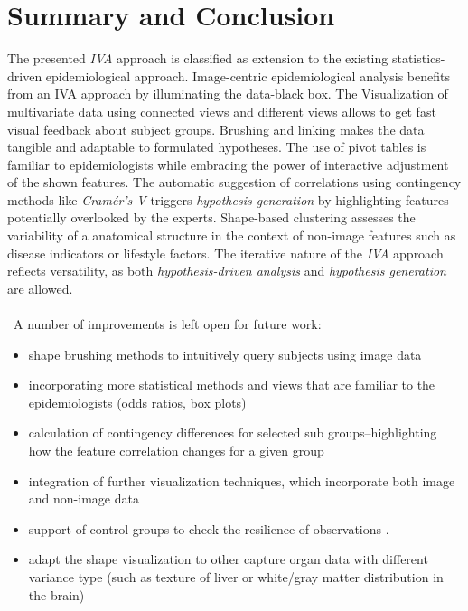 \documentclass[journal]{style/vgtc} 			          %
\begin{document}
\section{Summary and Conclusion}
The presented \emph{IVA} approach is classified as extension to the existing statistics-driven epidemiological approach.
%
Image-centric epidemiological analysis benefits from an IVA approach by illuminating the data-black box.
%
The Visualization of multivariate data using connected views and different views allows to get fast visual feedback about subject groups.
%
Brushing and linking makes the data tangible and adaptable to formulated hypotheses.
%
The use of pivot tables is familiar to epidemiologists while embracing the power of interactive adjustment of the shown features.
%
The automatic suggestion of correlations using contingency methods like \emph{Cram\'{e}r's V} triggers \emph{hypothesis generation} by highlighting features potentially overlooked by the experts.
%
Shape-based clustering assesses the variability of a anatomical structure in the context of non-image features such as disease indicators or lifestyle factors.
%
The iterative nature of the \emph{IVA} approach reflects versatility, as both \emph{hypothesis-driven analysis} and \emph{hypothesis generation} are allowed.
\\\\\
A number of improvements is left open for future work:
\begin{itemize}
	\item shape brushing methods to intuitively query subjects using image data
	\item incorporating more statistical methods and views that are familiar to the epidemiologists (odds ratios, box plots)
	\item calculation of contingency differences for selected sub groups--highlighting how the feature correlation changes for a given group
	\item integration of further visualization techniques, which incorporate both image and non-image data
	\item support of control groups to check the resilience of observations \cite{Fletcher2012}.
	\item adapt the shape visualization to other capture organ data with different variance type (such as texture of liver or white/gray matter distribution in the brain)
\end{itemize}
\end{document}

